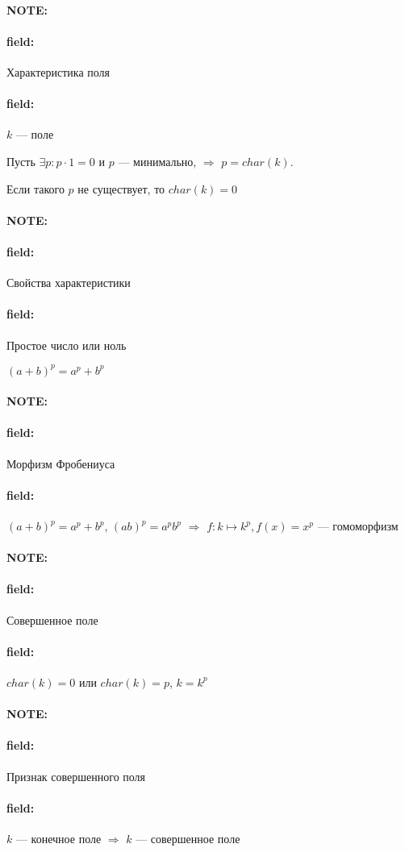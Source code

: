 \documentclass[12pt]{article}
\newenvironment{note}{\paragraph{NOTE:}}{}
\newenvironment{field}{\paragraph{field:}}{}
\begin{document}
\begin{note}
  \begin{field}
    Характеристика поля
  \end{field}
  \begin{field}
    $k$ --- поле

    Пусть $\exists p : p \cdot 1 = 0$
    и $p$ --- минимально,
    $\Rightarrow$
    $p = char(k)$.

    Если такого $p$ не существует, то $char(k) = 0$
  \end{field}
\end{note}

\begin{note}
  \begin{field}
    Свойства характеристики
  \end{field}
  \begin{field}
    Простое число или ноль

    $(a + b)^{p} = a^{p} + b^{p}$
  \end{field}
\end{note}

\begin{note}
  \begin{field}
    Морфизм Фробениуса
  \end{field}
  \begin{field}
    $(a + b)^{p} = a^{p} + b^{p}$,
    $(ab)^{p} = a^{p}b^{p}$
    $\Rightarrow$
    $f : k \mapsto k^{p}, f(x) = x^{p}$ --- гомоморфизм
  \end{field}
\end{note}

\begin{note}
  \begin{field}
    Совершенное поле
  \end{field}
  \begin{field}
    $char(k) = 0$ или $char(k) = p$, $k = k^{p}$
  \end{field}
\end{note}

\begin{note}
  \begin{field}
    Признак совершенного поля
  \end{field}
  \begin{field}
    $k$ --- конечное поле
    $\Rightarrow$
    $k$ --- совершенное поле
  \end{field}
\end{note}
\end{document}

